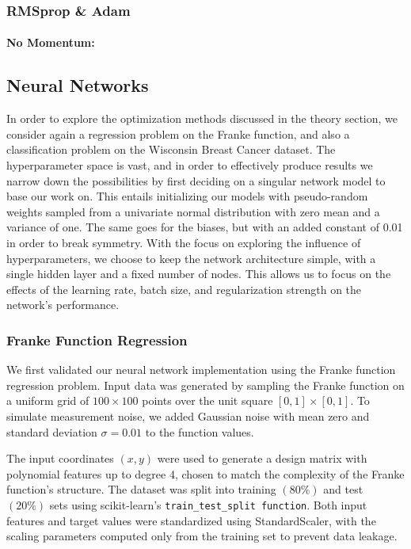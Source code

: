 \subsubsection{RMSprop \& Adam}
\paragraph{No Momentum:}

\subsection{Neural Networks}
In order to explore the optimization methods discussed in the theory section, we consider again a regression problem on the Franke function, and also a classification problem on the Wisconsin Breast Cancer dataset. 
The hyperparameter space is vast, and in order to effectively produce results we narrow down the possibilities by first deciding on a singular network model to base our work on. This entails initializing our models with pseudo-random weights sampled from a univariate normal distribution with zero mean and a variance of one. The same goes for the biases, but with an added constant of 0.01 in order to break symmetry. With the focus on exploring the influence of hyperparameters, we choose to keep the network architecture simple, with a single hidden layer and a fixed number of nodes. This allows us to focus on the effects of the learning rate, batch size, and regularization strength on the network's performance.
\subsubsection{Franke Function Regression}

We first validated our neural network implementation using the Franke function regression problem. Input data was generated by sampling the Franke function on a uniform grid of \( 100 \times 100 \) points over the unit square \( [0,1]\times[0,1] \). To simulate measurement noise, we added Gaussian noise with mean zero and standard deviation \( \sigma = 0.01 \) to the function values.

The input coordinates \( (x,y) \) were used to generate a design matrix with polynomial features up to degree 4, chosen to match the complexity of the Franke function's structure. The dataset was split into training \( (80\%) \) and test \( (20\%) \) sets using scikit-learn's \verb|train_test_split function|. Both input features and target values were standardized using StandardScaler, with the scaling parameters computed only from the training set to prevent data leakage.

